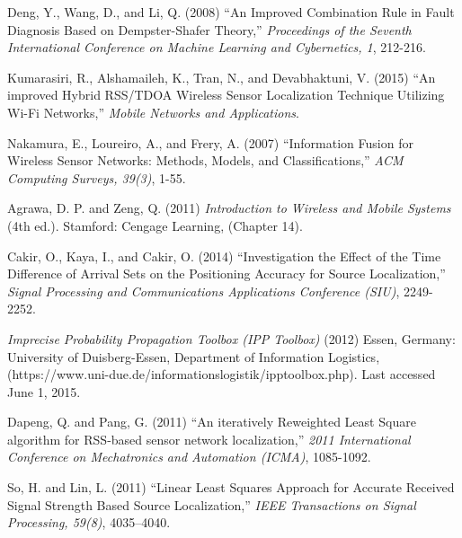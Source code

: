\documentclass[12pt]{uthesis-v12}  %
\begin{document}
\begin{thebibliography}{00}
Deng, Y., Wang, D., and Li, Q. (2008) ``An Improved Combination Rule in Fault Diagnosis Based on Dempster-Shafer Theory,'' {\it Proceedings of the Seventh International Conference on Machine Learning and Cybernetics, 1}, 212-216.

Kumarasiri, R., Alshamaileh, K., Tran, N., and Devabhaktuni, V. (2015) ``An improved Hybrid RSS/TDOA Wireless Sensor Localization Technique Utilizing Wi-Fi Networks,'' {\it Mobile Networks and Applications}.



Nakamura, E., Loureiro, A., and Frery, A. (2007) ``Information Fusion for Wireless Sensor Networks: Methods, Models, and Classifications,'' {\it ACM Computing Surveys, 39(3)}, 1-55.

Agrawa, D. P. and Zeng, Q. (2011) {\it Introduction to Wireless and Mobile Systems} (4th ed.). Stamford: Cengage Learning, (Chapter 14).

Cakir, O., Kaya, I., and Cakir, O. (2014) ``Investigation the Effect of the Time Difference of Arrival Sets on the Positioning Accuracy for Source Localization,'' {\it Signal Processing and Communications Applications Conference (SIU)}, 2249-2252.

{\it Imprecise Probability Propagation Toolbox (IPP Toolbox)} (2012) Essen, Germany: University of Duisberg-Essen, Department of Information Logistics, (https://www.uni-due.de/informationslogistik/ipptoolbox.php). Last accessed June 1, 2015.

Dapeng, Q. and Pang, G. (2011) ``An iteratively Reweighted Least Square algorithm for RSS-based sensor network localization,'' {\it 2011 International Conference on Mechatronics and Automation (ICMA)}, 1085-1092.


So, H. and Lin, L. (2011) ``Linear Least Squares Approach for Accurate Received Signal Strength Based Source Localization,'' {\it IEEE Transactions on  Signal Processing, 59(8)}, 4035--4040.


\end{thebibliography}
\end{document}
